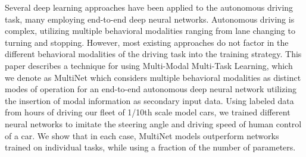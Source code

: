 Several deep learning approaches have been applied to the autonomous driving task, many employing end-to-end deep neural networks. Autonomous driving is complex, utilizing multiple behavioral modalities ranging from lane changing to turning and stopping. However, most existing approaches do not factor in the different behavioral modalities of the driving task into the training strategy. This paper describes a technique for using Multi-Modal Multi-Task Learning, which we denote as MultiNet which considers multiple behavioral modalities as distinct modes of operation for an end-to-end autonomous deep neural network utilizing the insertion of modal information as secondary input data. Using labeled data from hours of driving our fleet of 1/10th scale model cars, we trained different neural networks to imitate the steering angle and driving speed of human control of a car. We show that in each case, MultiNet models outperform networks trained on individual tasks, while using a fraction of the number of parameters.